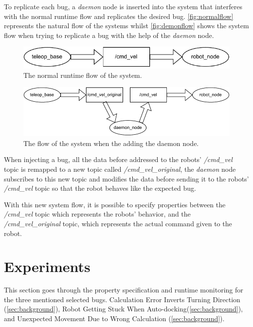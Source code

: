To replicate each bug, a \textit{daemon} node is inserted into the system that interferes with the normal runtime flow and replicates the desired bug. \autoref{fig:normalflow} represents the natural flow of the systems whilst \autoref{fig:demonflow} shows the system flow when trying to replicate a bug with the help of the \textit{daemon} node.

\begin{figure}[htb]
\includegraphics[width=\textwidth]{images/normal_flow.pdf}
\caption{The normal runtime flow of the system.} \label{fig:normalflow}
\end{figure}
    
\begin{figure}[htb]
\includegraphics[width=\textwidth]{images/demon_flow.pdf}
\caption{The flow of the system when the adding the daemon node.} \label{fig:demonflow}
\end{figure}

When injecting a bug, all the data before addressed to the robots' \textit{/cmd\_vel} topic is remapped to a new topic called \textit{/cmd\_vel\_original}, the \textit{daemon} node subscribes to this new topic and modifies the data before sending it to the robots' \textit{/cmd\_vel} topic so that the robot behaves like the expected bug. 

With this new system flow, it is possible to specify properties between the \textit{/cmd\_vel} topic which represents the robots' behavior, and the \textit{/cmd\_vel\_original} topic, which represents the actual command given to the robot.


\section{Experiments}
\label{sec:experiments}

This section goes through the property specification and runtime monitoring for the three mentioned selected bugs. Calculation Error Inverts Turning Direction (\autoref{sec:background}), Robot Getting Stuck When Auto-docking(\autoref{sec:background}), and Unexpected Movement Due to Wrong Calculation (\autoref{sec:background}).


